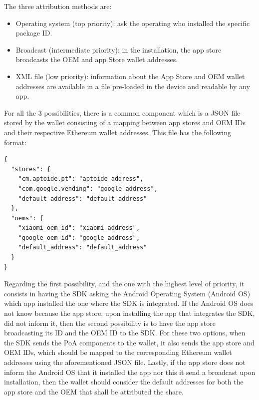 The three attribution methods are:

\begin{itemize}
\item Operating system (top priority): ask the operating who installed the specific package ID.
\item Broadcast (intermediate priority): in the installation, the app store broadcasts the OEM and app Store wallet addresses.
\item XML file (low priority): information about the App Store and OEM wallet addresses are available in a file pre-loaded in the device and readable by any app.  
\end{itemize}

For all the 3 possibilities, there is a common component which is a JSON file stored by the wallet consisting of a mapping between app stores and OEM IDs and their respective Ethereum wallet addresses. This file has the following format:
\begin{tcolorbox}[enhanced jigsaw,sharp corners, drop fuzzy shadow=ShadowColor]
\begin{lstlisting}
{
  "stores": {
    "cm.aptoide.pt": "aptoide_address",
    "com.google.vending": "google_address",
    "default_address": "default_address"
  },
  "oems": {
    "xiaomi_oem_id": "xiaomi_address",
    "google_oem_id": "google_address",
    "default_address": "default_address"
  }
}
\end{lstlisting}
\end{tcolorbox} 

Regarding the first possibility, and the one with the highest level of priority, it consists in having the SDK asking the Android Operating System (Android OS) which app installed the one where the SDK is integrated. If the Android OS does not know because the app store, upon installing the app that integrates the SDK, did not inform it, then the second possibility is to have the app store broadcasting its ID and the OEM ID to the SDK. For these two options, when the SDK sends the \textsf{PoA} components to the wallet, it also sends the app store and OEM IDs, which should be mapped to the corresponding Ethereum wallet addresses using the aforementioned JSON file. Lastly, if the app store does not inform the Android OS that it installed the app nor this it send a broadcast upon installation, then the wallet should consider the default addresses for both the app store and the OEM that shall be attributed the share. 


\medskip

